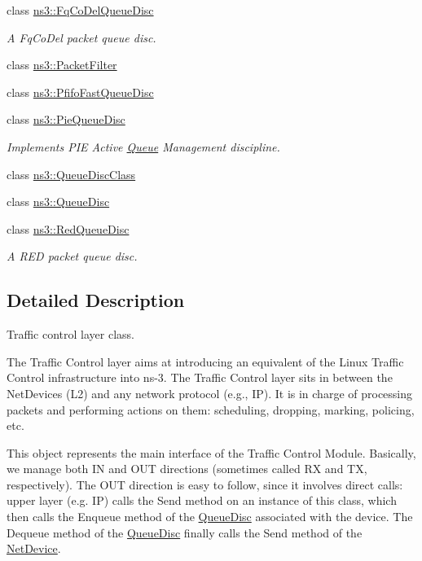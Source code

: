 \begin{DoxyCompactItemize}
class \hyperlink{classns3_1_1FqCoDelQueueDisc}{ns3\+::\+Fq\+Co\+Del\+Queue\+Disc}
\begin{DoxyCompactList}\small\item\em A Fq\+Co\+Del packet queue disc. \end{DoxyCompactList}\item 
class \hyperlink{classns3_1_1PacketFilter}{ns3\+::\+Packet\+Filter}
\item 
class \hyperlink{classns3_1_1PfifoFastQueueDisc}{ns3\+::\+Pfifo\+Fast\+Queue\+Disc}
\item 
class \hyperlink{classns3_1_1PieQueueDisc}{ns3\+::\+Pie\+Queue\+Disc}
\begin{DoxyCompactList}\small\item\em Implements P\+IE Active \hyperlink{classns3_1_1Queue}{Queue} Management discipline. \end{DoxyCompactList}\item 
class \hyperlink{classns3_1_1QueueDiscClass}{ns3\+::\+Queue\+Disc\+Class}
\item 
class \hyperlink{classns3_1_1QueueDisc}{ns3\+::\+Queue\+Disc}
\item 
class \hyperlink{classns3_1_1RedQueueDisc}{ns3\+::\+Red\+Queue\+Disc}
\begin{DoxyCompactList}\small\item\em A R\+ED packet queue disc. \end{DoxyCompactList}\end{DoxyCompactItemize}


\subsection{Detailed Description}
Traffic control layer class. 

The Traffic Control layer aims at introducing an equivalent of the Linux Traffic Control infrastructure into ns-\/3. The Traffic Control layer sits in between the Net\+Devices (L2) and any network protocol (e.\+g., IP). It is in charge of processing packets and performing actions on them\+: scheduling, dropping, marking, policing, etc.

This object represents the main interface of the Traffic Control Module. Basically, we manage both IN and O\+UT directions (sometimes called RX and TX, respectively). The O\+UT direction is easy to follow, since it involves direct calls\+: upper layer (e.\+g. IP) calls the Send method on an instance of this class, which then calls the Enqueue method of the \hyperlink{classns3_1_1QueueDisc}{Queue\+Disc} associated with the device. The Dequeue method of the \hyperlink{classns3_1_1QueueDisc}{Queue\+Disc} finally calls the Send method of the \hyperlink{classns3_1_1NetDevice}{Net\+Device}.

